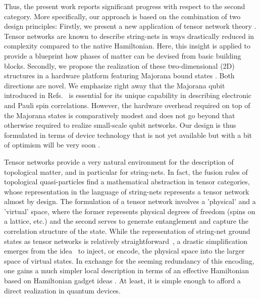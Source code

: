 \documentclass[twocolumn,floats,prx,showpacs]{revtex4-1}
\newcommand{\rein}[1]{{\color{rein} #1}}
\begin{document}
Thus, the present work reports significant progress with respect to the second category. More specifically, our approach is based on the combination of two design principles: Firstly, we present a new application of tensor network theory \cite{Orus-AnnPhys-2014,AreaReview,VerstraeteBig,SchuchReview}. 
Tensor networks are known to describe string-nets in ways drastically reduced in complexity compared to the native Hamiltonian. Here,  this insight is applied to provide
 a blueprint how phases of matter can be devised from basic building blocks. Secondly, we propose the realization of these two-dimensional (2D) structures in a hardware platform featuring Majorana bound states \cite{Alicea2012,Leijnse2012,Beenakker2013,Sarma2015,Aguado2017,Lutchyn2018,Mourik2012,Albrecht2016,Deng2016,Nichele2017,Gazi2017,Zhang2018}. Both directions are novel.  We emphasize right away that the Majorana qubit introduced in Refs.~\cite{Beri2012,Beri2013,Altland2013,Plugge2017,Karzig2017} is essential for its unique capability in describing electronic and Pauli spin correlations. However, the hardware overhead required on top of the Majorana states is comparatively modest and does not go beyond that otherwise required to realize small-scale qubit networks. Our design is thus formulated in terms of device technology that is not yet available  but with a bit of optimism will be very soon \cite{Lutchyn2018}.

Tensor networks provide a very natural environment for the description of topological matter, and in particular for string\nobreakdash -nets. In fact, the fusion rules of topological quasi-particles find a mathematical abstraction in tensor categories,  whose representation in  the language of string-nets represents a tensor network almost by design. The formulation of a tensor network involves a   'physical' and a 'virtual' space, where the former represents physical  degrees of freedom (spins on a lattice, etc.) and the second serves to generate entanglement and capture the correlation structure of the state.  While the representation of string-net ground states as tensor networks is relatively straightforward~\cite{Gu2009,Buerschaper2009}, a drastic simplification emerges from the idea~\cite{Schuch_MPS,1409.2150,FermionicMPO,PhysRevB.95.245127} to inject, or encode, the physical space into the larger space of virtual states. In exchange for the seeming redundancy of this encoding, one gains a much simpler local description in terms of an effective Hamiltonian \cite{Brell2014PEPS} \rein{based on Hamiltonian gadget ideas \cite{Kempe-SIAM-2006, PhysRevA.77.062329}.} At least, it is simple enough to afford a direct realization in quantum devices.
\end{document}
